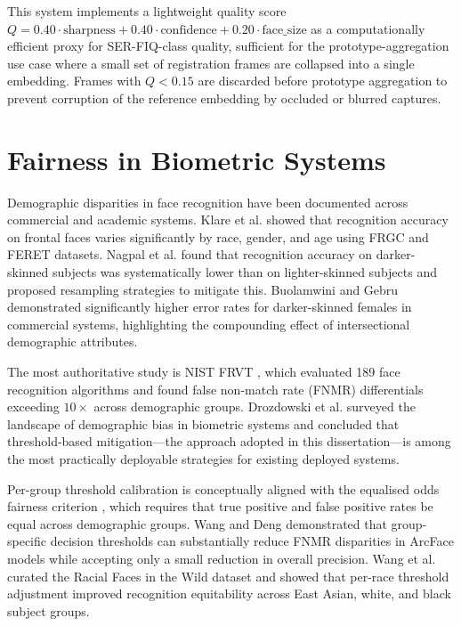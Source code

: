 \documentclass[12pt,a4paper]{report}
\begin{document}
This system implements a lightweight quality score $Q = 0.40 \cdot \text{sharpness} + 0.40 \cdot \text{confidence} + 0.20 \cdot \text{face\_size}$ as a computationally efficient proxy for SER-FIQ-class quality, sufficient for the prototype-aggregation use case where a small set of registration frames are collapsed into a single embedding. Frames with $Q < 0.15$ are discarded before prototype aggregation to prevent corruption of the reference embedding by occluded or blurred captures.

\section{Fairness in Biometric Systems}
Demographic disparities in face recognition have been documented across commercial and academic systems. Klare et al. \cite{klare2012face} showed that recognition accuracy on frontal faces varies significantly by race, gender, and age using FRGC and FERET datasets. Nagpal et al. \cite{nagpal2019deep} found that recognition accuracy on darker-skinned subjects was systematically lower than on lighter-skinned subjects and proposed resampling strategies to mitigate this. Buolamwini and Gebru \cite{buolamwini2018gender} demonstrated significantly higher error rates for darker-skinned females in commercial systems, highlighting the compounding effect of intersectional demographic attributes.

The most authoritative study is NIST FRVT \cite{grother2019frvt}, which evaluated 189 face recognition algorithms and found false non-match rate (FNMR) differentials exceeding $10\times$ across demographic groups. Drozdowski et al. \cite{drozdowski2020demographic} surveyed the landscape of demographic bias in biometric systems and concluded that threshold-based mitigation—the approach adopted in this dissertation—is among the most practically deployable strategies for existing deployed systems.

Per-group threshold calibration is conceptually aligned with the equalised odds fairness criterion \cite{hardt2016equality}, which requires that true positive and false positive rates be equal across demographic groups. Wang and Deng \cite{wang2020mitigating} demonstrated that group-specific decision thresholds can substantially reduce FNMR disparities in ArcFace models while accepting only a small reduction in overall precision. Wang et al. \cite{wang2019racial} curated the Racial Faces in the Wild dataset and showed that per-race threshold adjustment improved recognition equitability across East Asian, white, and black subject groups.
\end{document}
